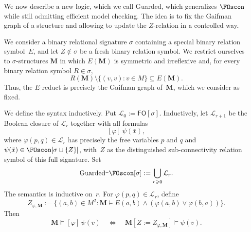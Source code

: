 \documentclass[1p,number,11pt]{elsarticle}
\newcommand{\GFOscon}{\textup{Guarded}\raisebox{0.4pt}{\texttt{-}}\FOscon}
\renewcommand{\phi}{\varphi}
\theoremstyle{plain}
\renewcommand{\FO}{\ensuremath{\mathsf{FO}}}
\renewcommand{\geq}{\geqslant}
\begin{document}
We now describe a new logic, which we call {\GFOscon}, which generalizes
$\FOscon$ while still admitting efficient model checking. The idea is to fix the Gaifman graph of a structure and allowing to update the $Z$-relation in a controlled way. 

We consider a binary relational signature $\sigma$ containing a special
binary relation symbol~$E$, and let $Z\notin\sigma$ be a fresh binary relation
symbol. We restrict ourselves to $\sigma$-structures $\mathbf M$ in which
$E(\mathbf M)$ is symmetric and irreflexive and, for every binary relation
symbol $R\in\sigma$,
\[
 R(\mathbf M)\setminus\{(v,v):v\in M\}\subseteq E(\mathbf M).
\]
Thus, the $E$-reduct is precisely the Gaifman graph of~$\mathbf M$, which we consider as fixed. 

We define the syntax inductively. Put $\mathcal L_0:=\FO[\sigma]$. Inductively, let
$\mathcal L_{r+1}$ be the Boolean closure of $\mathcal L_r$ together with all
formulas
\[
 [\phi]\,\psi(\bar x),
\]
where $\phi(p,q)\in\mathcal L_r$ has precisely the free variables $p$ and $q$
and $\psi(\bar x)\in\FOscon[\sigma\cup\{Z\}]$, with~$Z$ as the distinguished
sub-connectivity relation symbol of this full signature. Set
\[
 \GFOscon[\sigma]:=\bigcup_{r\geq0}\mathcal L_r.
\]
The semantics is inductive on~$r$. For $\phi(p,q)\in\mathcal L_r$, define
\[
 Z_{\phi,\mathbf M}
 :=
 \{(a,b)\in M^2:\mathbf M\models
 E(a,b)\wedge(\phi(a,b)\vee\phi(b,a))\}.
\]
Then
\[
 \mathbf M\models[\phi]\,\psi(\bar v)
 \quad\Longleftrightarrow\quad
 \mathbf M[Z:=Z_{\phi,\mathbf M}]\models\psi(\bar v).
\]
\end{document}
